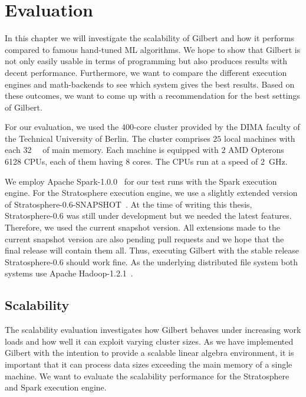\chapter{Evaluation}
\label{cha:evaluation}


In this chapter we will investigate the scalability of Gilbert and how it performs compared to famous hand-tuned ML algorithms.
We hope to show that Gilbert is not only easily usable in terms of programming but also produces results with decent performance.
Furthermore, we want to compare the different execution engines and math-backends to see which system gives the best results.
Based on these outcomes, we want to come up with a recommendation for the best settings of Gilbert.

For our evaluation, we used the $400$-core cluster provided by the DIMA faculty of the Technical University of Berlin.
The cluster comprises $25$ local machines with each \SI{32}{\giga\byte} of main memory.
Each machine is equipped with $2$ AMD Opterons 6128 CPUs, each of them having $8$ cores.
The CPUs run at a speed of \SI{2}{\giga\hertz}.

We employ Apache Spark-1.0.0~\cite{spark} for our test runs with the Spark execution engine.
For the Stratosphere execution engine, we use a slightly extended version of Stratosphere-0.6-SNAPSHOT~\cite{stratosphere}.
At the time of writing this thesis, Stratosphere-0.6 was still under development but we needed the latest features.
Therefore, we used the current snapshot version.
All extensions made to the current snapshot version are also pending pull requests and we hope that the final release will contain them all.
Thus, executing Gilbert with the stable release Stratosphere-0.6 should work fine.
As the underlying distributed file system both systems use Apache Hadoop-1.2.1~\cite{hadoop:2008a}.

\section{Scalability}

The scalability evaluation investigates how Gilbert behaves under increasing work loads and how well it can exploit varying cluster sizes.
As we have implemented Gilbert with the intention to provide a scalable linear algebra environment, it is important that it can process data sizes exceeding the main memory of a single machine.
We want to evaluate the scalability performance for the Stratosphere and Spark execution engine.

